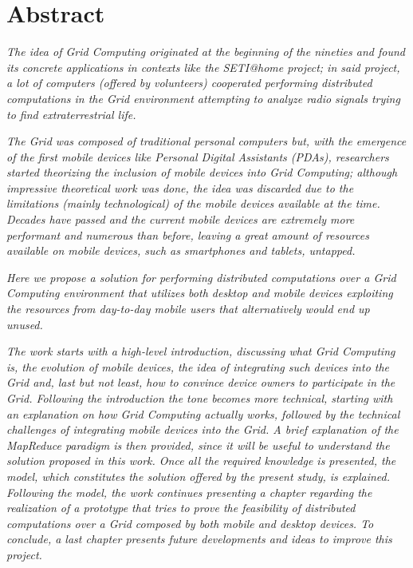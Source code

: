 \chapter*{Abstract}
\begin{spacing}{1.3}
\textit{\small
The idea of Grid Computing originated at the beginning of the nineties and found its concrete applications in contexts like the SETI@home project; in said project, a lot of computers (offered by volunteers) cooperated performing distributed computations in the Grid environment attempting to analyze radio signals trying to find extraterrestrial life.
}\newline

\textit{\small
The Grid was composed of traditional personal computers but, with the emergence of the first mobile devices like Personal Digital Assistants (PDAs), researchers started theorizing the inclusion of mobile devices into Grid Computing; although impressive theoretical work was done, the idea was discarded due to the limitations (mainly technological) of the mobile devices available at the time. Decades have passed and the current mobile devices are extremely more performant and numerous than before, leaving a great amount of resources available on mobile devices, such as smartphones and tablets, untapped.
}\newline

\textit{\small
Here we propose a solution for performing distributed computations over a Grid Computing environment that utilizes both desktop and mobile devices exploiting the resources from day-to-day mobile users that alternatively would end up unused.
}\newline

\textit{\small
The work starts with a high-level introduction, discussing what Grid Computing is, the evolution of mobile devices, the idea of integrating such devices into the Grid and, last but not least, how to convince device owners to participate in the Grid. Following the introduction the tone becomes more technical, starting with an explanation on how Grid Computing actually works, followed by the technical challenges of integrating mobile devices into the Grid. A brief explanation of the MapReduce paradigm is then provided, since it will be useful to understand the solution proposed in this work. Once all the required knowledge is presented, the model, which constitutes the solution offered by the present study, is explained. Following the model, the work continues presenting a chapter regarding the realization of a prototype that tries to prove the feasibility of distributed computations over a Grid composed by both mobile and desktop devices. To conclude, a last chapter presents future developments and ideas to improve this project.
}
\end{spacing}
